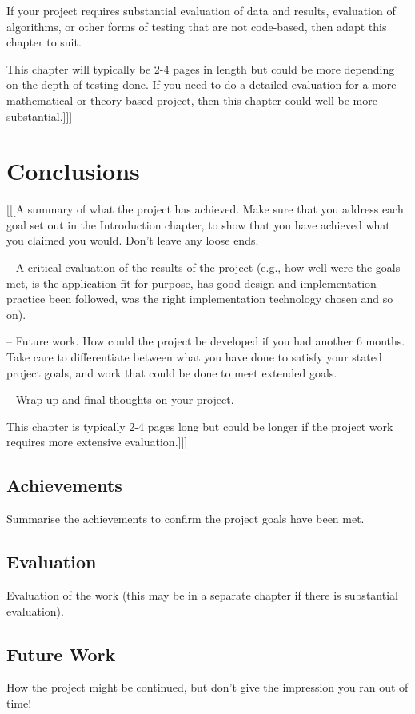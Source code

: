 \documentclass{report}
\begin{document}
If your project requires substantial evaluation of data and results, evaluation of algorithms, or other forms of testing that are not code-based, then adapt this chapter to suit.

This chapter will typically be 2-4 pages in length but could be more depending on the depth of testing done. If you need to do a detailed evaluation for a more mathematical or theory-based project, then this chapter could well be more substantial.]]]


\chapter{Conclusions}

[[[A summary of what the project has achieved. Make sure that you address each goal set out in the Introduction chapter, to show that you have achieved what you claimed you would. Don’t leave any loose ends.

– A critical evaluation of the results of the project (e.g., how well were the goals met, is the application fit for purpose, has good design and implementation practice been followed, was the right implementation technology chosen and so on).

– Future work. How could the project be developed if you had another 6 months. Take care to differentiate between what you have done to satisfy your stated project goals, and work that could be done to meet extended goals.

– Wrap-up and final thoughts on your project. 

This chapter is typically 2-4 pages long but could be longer if the project work requires more extensive evaluation.]]]

\section{Achievements}
Summarise the achievements to confirm the project goals have been met.

\section{Evaluation}
Evaluation of the work (this may be in a separate chapter if there is substantial evaluation).

\section{Future Work}
How the project might be continued, but don't give the impression you ran out of time!
\end{document}
